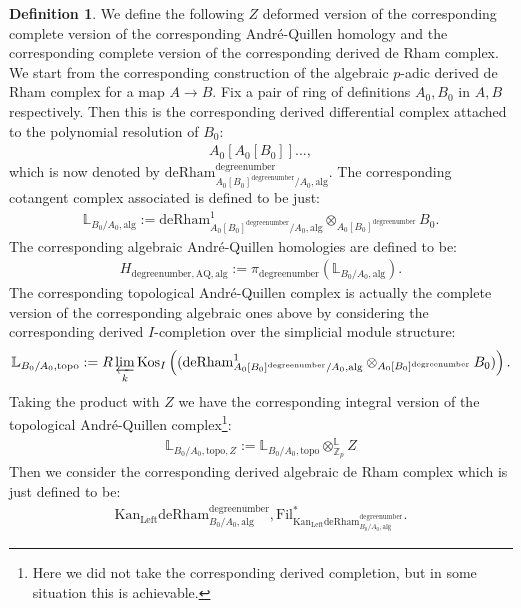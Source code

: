 \documentclass[11pt]{book}
\theoremstyle{definition}
\newtheorem{definition}[theorem]{Definition}
\numberwithin{equation}{section}
\begin{document}
\begin{definition}
We define the following $Z$ deformed version of the corresponding complete version of the corresponding Andr\'e-Quillen homology and the corresponding complete version of the corresponding derived de Rham complex. We start from the corresponding construction of the algebraic $p$-adic derived de Rham complex for a map $A\rightarrow B$. Fix a pair of ring of definitions $A_0,B_0$ in $A,B$ respectively. Then this is the corresponding derived differential complex attached to the polynomial resolution of $B_0$:
\begin{align}
A_0[A_0[B_0]]...,	
\end{align}
which is now denoted by $\mathrm{deRham}^\text{degreenumber}_{A_0[B_0]^\text{degreenumber}/A_0,\mathrm{alg}}$. The corresponding cotangent complex associated is defined to be just:
\begin{align}
\mathbb{L}_{B_0/A_0,\mathrm{alg}}:=	\mathrm{deRham}^1_{A_0[B_0]^\text{degreenumber}/A_0,\mathrm{alg}}\otimes_{A_0[B_0]^\text{degreenumber}} B_0.
\end{align}
The corresponding algebraic Andr\'e-Quillen homologies are defined to be:
\begin{align}
H_{\text{degreenumber},{\mathrm{AQ}},\mathrm{alg}}:=\pi_\text{degreenumber} (\mathbb{L}_{B_0/A_0,\mathrm{alg}}). 	
\end{align}
The corresponding topological Andr\'e-Quillen complex is actually the complete version of the corresponding algebraic ones above by considering the corresponding derived $I$-completion over the simplicial module structure:
\begin{align}
\mathbb{L}_{B_0/A_0,\mathrm{topo}}:=R\varprojlim_k	\mathrm{Kos}_I\left((\mathrm{deRham}^1_{A_0[B_0]^\text{degreenumber}/A_0,\mathrm{alg}}\otimes_{A_0[B_0]^\text{degreenumber}} B_0)\right).
\end{align}
Taking the product with $Z$ we have the corresponding integral version of the topological Andr\'e-Quillen complex\footnote{Here we did not take the corresponding derived completion, but in some situation this is achievable.}:
\begin{align}
\mathbb{L}_{B_0/A_0,\mathrm{topo},Z}:=\mathbb{L}_{B_0/A_0,\mathrm{topo}}{\otimes}^\mathbb{L}_{\mathbb{Z}_p}Z
\end{align}
Then we consider the corresponding derived algebraic de Rham complex which is just defined to be:
\begin{align}
\mathrm{Kan}_\mathrm{Left}\mathrm{deRham}^\text{degreenumber}_{B_0/A_0,\mathrm{alg}},\mathrm{Fil}^*_{\mathrm{Kan}_\mathrm{Left}\mathrm{deRham}^\text{degreenumber}_{B_0/A_0,\mathrm{alg}}}.	

\end{align}
\end{definition}
\end{document}
